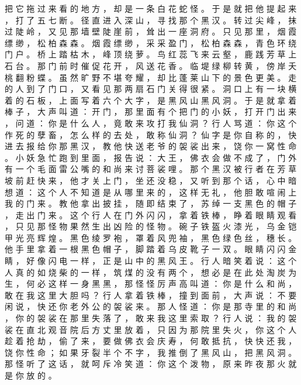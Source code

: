 {把 它 拖 过 来 看 的 地 方 ， 却 是 一 条 白 花 蛇 怪 。
于 是 就 把 他 提 起 来 ， 打 了 五 七 断 。
径 直 进 入 深 山 ， 寻 找 那 个 黑 汉 。
转 过 尖 峰 ， 抹 过 陡 岭 ， 又 见 那 墙 壁 陡 崖 前 ， 耸 出 一 座 洞 府 。
只 见 那 里 ， 烟 霞 缥 缈 ， 松 柏 森 森 。
烟 霞 缥 缈 ， 采 采 盈 门 ， 松 柏 森 森 ， 青 色 环 绕 门 户 。
桥 上 踏 枯 木 ， 峰 顶 绕 萝 。
鸟 红 蕊 飞 来 云 壑 ， 鹿 践 芳 草 上 石 台 。
那 门 前 时 催 促 花 开 ， 风 送 花 香 。
临 堤 绿 柳 转 黄 ， 傍 岸 夭 桃 翻 粉 蝶 。
虽 然 旷 野 不 堪 夸 耀 ， 却 比 蓬 莱 山 下 的 景 色 更 美 。
走 的 人 到 了 门 口 ， 又 看 见 那 两 扇 石 门 关 得 很 紧 。
洞 口 上 有 一 块 横 着 的 石 板 ， 上 面 写 着 六 个 大 字 ， 是 黑 风 山 黑 风 洞 。
于 是 就 拿 着 棒 子 ， 大 声 叫 道 ： 开 门 ， 那 里 面 有 个 把 门 的 小 妖 ， 打 开 门 出 来 ， 问 道 ： 你 是 什 么 人 ， 竟 敢 来 攻 打 我 仙 洞 ？ 行 人 骂 道 ： 你 这 个 作 死 的 孽 畜 ， 怎 么 样 的 去 处 ， 敢 称 仙 洞 ？ 仙 字 是 你 自 称 的 ， 快 进 去 报 给 你 那 黑 汉 ， 教 他 快 送 老 爷 的 袈 裟 出 来 ， 饶 你 一 窝 性 命 。
小 妖 急 忙 跑 到 里 面 ， 报 告 说 ： 大 王 ， 佛 衣 会 做 不 成 了 ， 门 外 有 一 个 毛 面 雷 公 嘴 的 和 尚 来 讨 菩 裟 哩 。
那 个 黑 汉 被 行 者 在 芳 草 坡 前 赶 快 来 ， 他 才 关 上 门 ， 坐 还 没 稳 ， 又 听 到 那 个 话 ， 心 中 暗 想 道 ： 这 个 人 不 知 道 是 从 哪 里 来 的 ， 这 样 无 礼 ， 他 胆 敢 喧 闹 上 我 的 门 来 。
教 他 拿 出 披 挂 ， 随 即 结 束 了 ， 苏 绰 一 支 黑 色 的 帽 子 ， 走 出 门 来 。
这 个 行 人 在 门 外 闪 闪 ， 拿 着 铁 棒 ， 睁 着 眼 睛 观 看 ， 只 见 那 怪 物 果 然 生 出 凶 险 的 怪 物 。 碗 子 铁 盔 火 漆 光 ， 乌 金 铠 甲 光 亮 辉 煌 。
黑 色 绫 罗 袍 ， 罩 着 风 兜 袖 ， 黑 色 绿 色 丝 ， 穗 长 。
他 手 里 拿 着 一 根 黑 色 帽 子 ， 脚 踏 着 乌 皮 靴 子 一 双 。
眼 睛 闪 闪 金 睛 ， 好 像 闪 电 一 样 ， 正 是 山 中 的 黑 风 王 。
行 人 暗 笑 着 说 ： 这 个 人 真 的 如 烧 柴 的 一 样 ， 筑 煤 的 没 有 两 个 ， 想 必 是 在 此 处 淘 炭 为 生 ， 何 必 这 样 一 身 黑 黑 ， 那 怪 怪 厉 声 高 叫 道 ： 你 是 什 么 和 尚 ， 敢 在 我 这 里 大 胆 吗 ？ 行 人 拿 着 铁 棒 ， 撞 到 面 前 ， 大 声 说 ： 不 要 闲 说 ， 快 还 你 老 外 公 的 袈 裟 来 。
那 人 怪 道 ： 你 是 那 寺 里 的 和 尚 ， 你 的 袈 裟 在 那 里 失 落 了 ， 敢 来 我 这 里 索 取 ？ 行 人 说 ： 我 的 袈 裟 在 直 北 观 音 院 后 方 丈 里 放 着 ， 只 因 为 那 院 里 失 火 ， 你 这 个 人 趁 着 抢 劫 ， 偷 了 来 ， 要 做 佛 衣 会 庆 寿 ， 何 敢 抵 抗 ， 快 快 还 我 ， 饶 你 性 命 ； 如 果 牙 裂 半 个 不 字 ， 我 推 倒 了 黑 风 山 ， 把 黑 风 洞 。
那 怪 听 了 这 话 ， 就 呵 斥 冷 笑 道 ： 你 这 个 泼 物 ， 原 来 昨 夜 那 火 就 是 你 放 的 。
}
